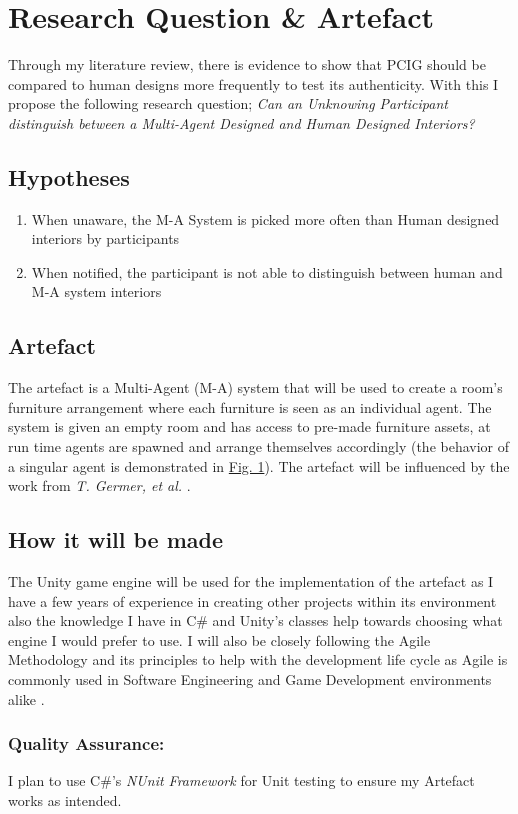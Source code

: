 \section{Research Question \& Artefact}
Through my literature review, there is evidence to show that PCIG should be compared to human designs more frequently to test its authenticity. With this I propose the following research question; \textit{Can an Unknowing Participant distinguish between a Multi-Agent Designed and Human Designed Interiors?}

\subsection{Hypotheses}
\begin{enumerate}
    \item When unaware, the M-A System is picked more often than Human designed interiors by participants
    \item When notified, the participant is not able to distinguish between human and M-A system interiors
\end{enumerate}

\subsection{Artefact}
The artefact is a Multi-Agent (M-A) system that will be used to create a room's furniture arrangement where each furniture is seen as an individual agent. The system is given an empty room and has access to pre-made furniture assets, at run time agents are spawned and arrange themselves accordingly (the behavior of a singular agent is demonstrated in \hyperref[activity-diagram]{Fig. 1}). The artefact will be influenced by the work from \textit{T. Germer, et al.} \cite{real-time-walkthroughs}.

\subsection{How it will be made} 
The Unity game engine\cite{unity} will be used for the implementation of the artefact as I have a few years of experience in creating other projects within its environment also the knowledge I have in C\# and Unity's classes help towards choosing what engine I would prefer to use.
I will also be closely following the Agile Methodology and its principles to help with the development life cycle as Agile is commonly used in Software Engineering and Game Development environments alike \cite{game-dev-agile}.

\subsubsection*{Quality Assurance:} I plan to use C\#'s \textit{NUnit Framework} \cite{nunit-framework} for Unit testing to ensure my Artefact works as intended.
